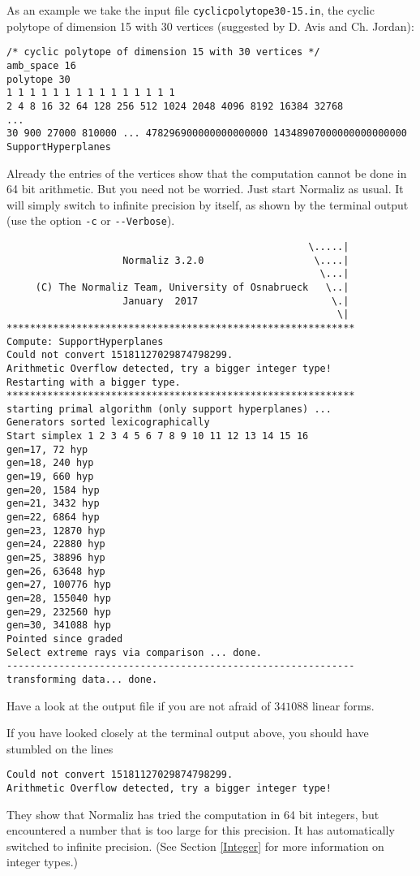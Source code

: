 \documentclass[12pt,a4paper]{scrartcl}
\theoremstyle{definition}
\begin{document}
As an example we take the input file \verb|cyclicpolytope30-15.in|, the cyclic polytope of dimension 15 with 30 vertices (suggested by D. Avis and Ch. Jordan):
\begin{Verbatim}
/* cyclic polytope of dimension 15 with 30 vertices */
amb_space 16
polytope 30
1 1 1 1 1 1 1 1 1 1 1 1 1 1 1
2 4 8 16 32 64 128 256 512 1024 2048 4096 8192 16384 32768
...
30 900 27000 810000 ... 478296900000000000000 14348907000000000000000
SupportHyperplanes
\end{Verbatim}
Already the entries of the vertices show that the computation cannot be done in 64 bit arithmetic. But you need not be worried. Just start Normaliz as usual. It will simply switch to infinite precision by itself, as shown by the terminal output (use the option \verb|-c| or \verb|--Verbose|).
\begin{Verbatim}
                                                    \.....|
                    Normaliz 3.2.0                   \....|
                                                      \...|
     (C) The Normaliz Team, University of Osnabrueck   \..|
                    January  2017                       \.|
                                                         \|
************************************************************
Compute: SupportHyperplanes 
Could not convert 15181127029874798299.
Arithmetic Overflow detected, try a bigger integer type!
Restarting with a bigger type.
************************************************************
starting primal algorithm (only support hyperplanes) ...
Generators sorted lexicographically
Start simplex 1 2 3 4 5 6 7 8 9 10 11 12 13 14 15 16 
gen=17, 72 hyp
gen=18, 240 hyp
gen=19, 660 hyp
gen=20, 1584 hyp
gen=21, 3432 hyp
gen=22, 6864 hyp
gen=23, 12870 hyp
gen=24, 22880 hyp
gen=25, 38896 hyp
gen=26, 63648 hyp
gen=27, 100776 hyp
gen=28, 155040 hyp
gen=29, 232560 hyp
gen=30, 341088 hyp
Pointed since graded
Select extreme rays via comparison ... done.
------------------------------------------------------------
transforming data... done.
\end{Verbatim}
Have a look at the output file if you are not afraid of $341088$ linear forms.

If you have looked closely at the terminal output above, you should have stumbled on the lines
\begin{Verbatim}
Could not convert 15181127029874798299.
Arithmetic Overflow detected, try a bigger integer type!
\end{Verbatim}
They show that Normaliz has tried the computation in 64 bit integers, but encountered a number that is too large for this precision. It has automatically switched to infinite precision. (See Section \ref{Integer} for more information on integer types.)
\end{document}
